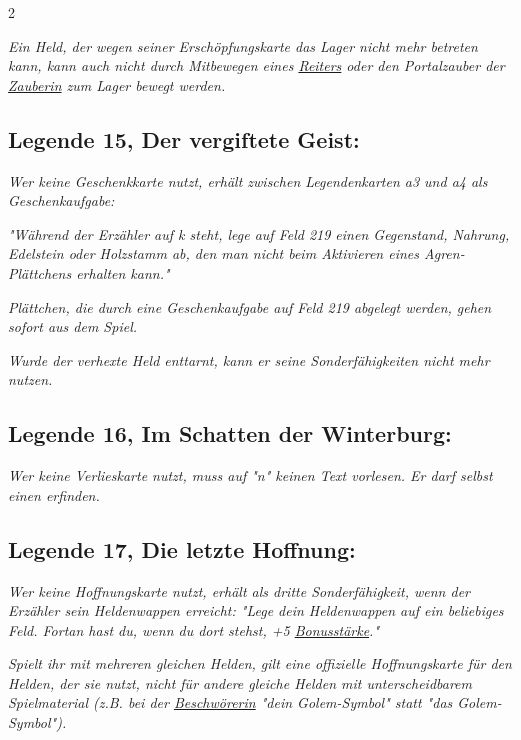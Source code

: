 \documentclass[10pt, a4paper, oneside]{book}
\newcommand{\fan}[1]{\textit{#1}}
\begin{document}
\begin{multicols*}{2}
\begin{bgcolor}
\fan{Ein Held, der wegen seiner Erschöpfungskarte das Lager nicht mehr betreten kann, kann auch nicht durch Mitbewegen eines \hyperref[reiter]{Reiters} oder den Portalzauber der \hyperref[zauberin]{Zauberin} zum Lager bewegt werden.}



\subsection{Legende 15, Der vergiftete Geist:}

\fan{Wer keine Geschenkkarte nutzt, erhält zwischen Legendenkarten a3 und a4 als Geschenkaufgabe:}

\fan{"Während der Erzähler auf k steht, lege auf Feld 219 einen Gegenstand, Nahrung, Edelstein oder Holzstamm ab, den man nicht beim Aktivieren eines Agren-Plättchens erhalten kann."}

\fan{Plättchen, die durch eine Geschenkaufgabe auf Feld 219 abgelegt werden, gehen sofort aus dem Spiel.}

\fan{Wurde der verhexte Held enttarnt, kann er seine Sonderfähigkeiten nicht mehr nutzen.}




\subsection{Legende 16, Im Schatten der Winterburg:}

\fan{Wer keine Verlieskarte nutzt, muss auf "n" keinen Text vorlesen. Er darf selbst einen erfinden.}




\subsection{Legende 17, Die letzte Hoffnung:}

\fan{Wer keine Hoffnungskarte nutzt, erhält als dritte Sonderfähigkeit, wenn der Erzähler sein Heldenwappen erreicht: "Lege dein Heldenwappen auf ein beliebiges Feld. Fortan hast du, wenn du dort stehst, +5 \hyperref[bonusstaerke]{Bonusstärke}."}

\fan{Spielt ihr mit mehreren gleichen Helden, gilt eine offizielle Hoffnungskarte für den Helden, der sie nutzt, nicht für andere gleiche Helden mit unterscheidbarem Spielmaterial (z.B. bei der \hyperref[beschwoererin]{Beschwörerin} "dein Golem-Symbol" statt "das Golem-Symbol").}

\end{bgcolor}




\end{multicols*}
\end{document}
